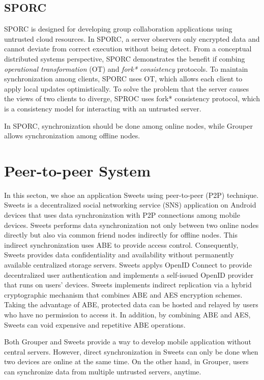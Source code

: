\documentclass[a4paper,11pt]{report}
\begin{document}
\subsection{SPORC}

SPORC\cite{feldman2010sporc} is designed for developing group collaboration applications using untrusted cloud resources.
In SPORC, a server observers only encrypted data and cannot deviate from correct execution without being detect.
From a conceptual distributed systems perspective, SPORC demonstrates the benefit if combing \emph{operational transformation} (OT)\cite{ellis1989concurrency} and \emph{fork* consistency}  protocols\cite{li2007beyond}.
To maintain synchronization among clients, SPORC uses OT, which allows each client to apply local updates optimistically.
To solve the problem that the server causes the views of two clients to diverge, SPROC uses fork* consistency protocol, which is a consistency model for interacting with an untrusted server.

In SPORC, synchronization should be done among online nodes, while Grouper allows synchronization among offline nodes.

\section{Peer-to-peer System}

In this secton, we shoe an application Sweets\cite{sweets} using peer-to-peer (P2P) technique. 
Sweets is a decentralized social networking service (SNS) application on Android devices that uses data synchronization with P2P connections among mobile devices. 
Sweets performs data synchronization not only between two online nodes directly but also via common friend nodes indirectly for offline nodes.
This indirect synchronization uses ABE to provide access control.
Consequently, Sweets provides data confidentiality and availability without permanently available centralized storage servers.
Sweets applys OpenID Connect\cite{openidconnect} to provide decentralized user authentication and implements a self-issued OpenID\cite{openid} provider that runs on users’ devices.
Sweets implements indirect replication via a hybrid cryptographic mechanism that combines ABE and AES encryption schemes. 
Taking the advantage of ABE, protected data can be hosted and relayed by users who have no permission to access it. 
In addition, by combining ABE and AES, Sweets can void expensive and repetitive ABE operations.

Both Grouper and Sweets provide a way to develop mobile application without central servers.
However, direct synchronization in Sweets can only be done when two devices are online at the same time. 
On the other hand, in Grouper, users can synchronize data from multiple untrusted servers, anytime.
\end{document}
